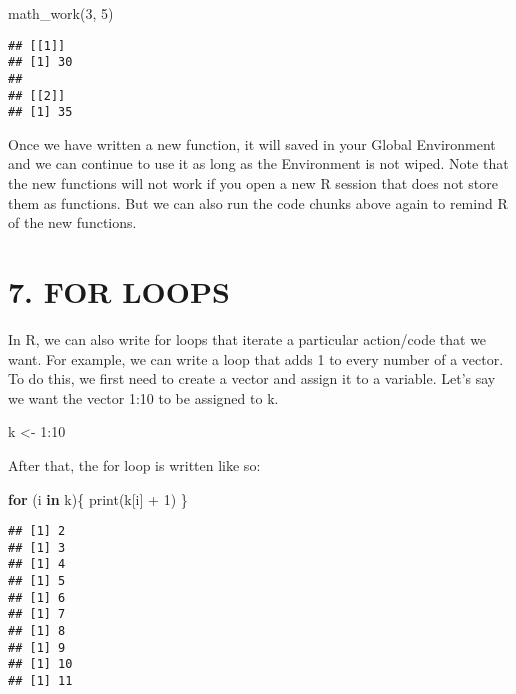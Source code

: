 \documentclass[
]{book}
\newenvironment{Shaded}{\begin{snugshade}}{\end{snugshade}}
\newcommand{\ControlFlowTok}[1]{\textcolor[rgb]{0.13,0.29,0.53}{\textbf{#1}}}
\newcommand{\DecValTok}[1]{\textcolor[rgb]{0.00,0.00,0.81}{#1}}
\newcommand{\FunctionTok}[1]{\textcolor[rgb]{0.00,0.00,0.00}{#1}}
\newcommand{\NormalTok}[1]{#1}
\newcommand{\OtherTok}[1]{\textcolor[rgb]{0.56,0.35,0.01}{#1}}
\newcommand{\SpecialCharTok}[1]{\textcolor[rgb]{0.00,0.00,0.00}{#1}}
\begin{document}
\begin{Shaded}
\begin{Highlighting}[]
\FunctionTok{math\_work}\NormalTok{(}\DecValTok{3}\NormalTok{, }\DecValTok{5}\NormalTok{)}
\end{Highlighting}
\end{Shaded}

\begin{verbatim}
## [[1]]
## [1] 30
##
## [[2]]
## [1] 35
\end{verbatim}

Once we have written a new function, it will saved in your Global Environment and we can continue to use it as long as the Environment is not wiped. Note that the new functions will not work if you open a new R session that does not store them as functions. But we can also run the code chunks above again to remind R of the new functions.

\hypertarget{for-loops}{%
\section{7. FOR LOOPS}\label{for-loops}}

In R, we can also write for loops that iterate a particular action/code that we want. For example, we can write a loop that adds 1 to every number of a vector. To do this, we first need to create a vector and assign it to a variable. Let's say we want the vector 1:10 to be assigned to k.

\begin{Shaded}
\begin{Highlighting}[]
\NormalTok{k }\OtherTok{\textless{}{-}} \DecValTok{1}\SpecialCharTok{:}\DecValTok{10}
\end{Highlighting}
\end{Shaded}

After that, the for loop is written like so:

\begin{Shaded}
\begin{Highlighting}[]
\ControlFlowTok{for}\NormalTok{ (i }\ControlFlowTok{in}\NormalTok{ k)\{}
  \FunctionTok{print}\NormalTok{(k[i] }\SpecialCharTok{+} \DecValTok{1}\NormalTok{)}
\NormalTok{\}}
\end{Highlighting}
\end{Shaded}

\begin{verbatim}
## [1] 2
## [1] 3
## [1] 4
## [1] 5
## [1] 6
## [1] 7
## [1] 8
## [1] 9
## [1] 10
## [1] 11
\end{verbatim}
\end{document}
